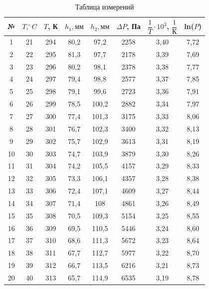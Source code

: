 \documentclass[a4paper, 12pt]{article}
\begin{document}
	\begin{table}[!ht]
		\centering
		\begin{tabular}{|c|c|c|c|c|c|c|c|}
		\hline
			№ & $T, ^\circ C$ & $T$, К & $h_1, мм$ &  $h_2, мм$ & $\Delta P$, Па & $\dfrac{1}{T} \cdot 10^3$, $\dfrac{1}{\text{К}}$ & ln($P$) \\ \hline
			1 & 21 & 294 & 80,2 & 97,2 & 2258 & 3,40 & 7,72 \\ \hline
			2 & 22 & 295 & 81,3 & 97,7 & 2178 & 3,39 & 7,69 \\ \hline
			3 & 23 & 296 & 80,2 & 98,1 & 2378 & 3,38 & 7,77 \\ \hline
			4 & 24 & 297 & 79,4 & 98,8 & 2577 & 3,37 & 7,85 \\ \hline
			5 & 25 & 298 & 79,1 & 99,6 & 2723 & 3,36 & 7,91 \\ \hline
			6 & 26 & 299 & 78,5 & 100,2 & 2882 & 3,34 & 7,97 \\ \hline
			7 & 27 & 300 & 77,4 & 101,3 & 3175 & 3,33 & 8,06 \\ \hline
			8 & 28 & 301 & 76,7 & 102,3 & 3400 & 3,32 & 8,13 \\ \hline
			9 & 29 & 302 & 75,7 & 102,9 & 3613 & 3,31 & 8,19 \\ \hline
			10 & 30 & 303 & 74,7 & 103,9 & 3879 & 3,30 & 8,26 \\ \hline
			11 & 31 & 304 & 74,2 & 105,5 & 4157 & 3,29 & 8,33 \\ \hline
			12 & 32 & 305 & 73,3 & 106,1 & 4357 & 3,28 & 8,38 \\ \hline
			13 & 33 & 306 & 72,4 & 107,1 & 4609 & 3,27 & 8,44 \\ \hline
			14 & 34 & 307 & 71,4 & 108 & 4861 & 3,26 & 8,49 \\ \hline
			15 & 35 & 308 & 70,5 & 109,3 & 5154 & 3,25 & 8,55 \\ \hline
			16 & 36 & 309 & 69,5 & 110,5 & 5446 & 3,24 & 8,60 \\ \hline
			17 & 37 & 310 & 68,6 & 111,3 & 5672 & 3,23 & 8,64 \\ \hline
			18 & 38 & 311 & 67,7 & 112,7 & 5977 & 3,22 & 8,70 \\ \hline
			19 & 39 & 312 & 66,7 & 113,5 & 6216 & 3,21 & 8,73 \\ \hline
			20 & 40 & 313 & 65,7 & 114,9 & 6535 & 3,19 & 8,78 \\ \hline
		\end{tabular}
		\caption{Таблица измерений}
	\end{table}

	\newpage
\end{document}
